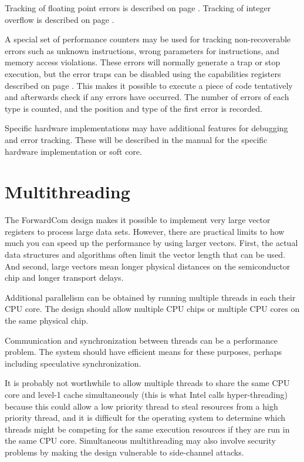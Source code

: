 \documentclass[forwardcom.tex]{subfiles}
\begin{document}
Tracking of floating point errors is described on page \pageref{ADifferentWayOfTrackingErrors}. Tracking of integer overflow is described on page \pageref{integerOverflowDetection}.
\vv

A special set of performance counters may be used for tracking non-recoverable errors such as unknown instructions, wrong parameters for instructions, and memory access violations. These errors will normally generate a trap or stop execution, but the error traps can be disabled using the capabilities registers described on page \pageref{table:capabilitiesRegisters}. This makes it possible to execute a piece of code tentatively and afterwards check if any errors have occurred. The number of errors of each type is counted, and the position and type of the first error is recorded.
\vv

Specific hardware implementations may have additional features for debugging and error tracking. These will be described in the manual for the specific hardware implementation or soft core.
\vv


\section{Multithreading}
The ForwardCom design makes it possible to implement very large vector registers to process large data sets. However, there are practical limits to how much you can speed up the performance by using larger vectors. First, the actual data structures and algorithms often limit the vector length that can be used. And second, large vectors mean longer physical distances on the semiconductor chip and longer transport delays.
\vv

Additional parallelism can be obtained by running multiple threads in each their CPU core. The design should allow multiple CPU chips or multiple CPU cores on the same physical chip.
\vv

Communication and synchronization between threads can be a performance problem. The system should have efficient means for these purposes, perhaps including speculative synchronization.
\vv

It is probably not worthwhile to allow multiple threads to share the same CPU core and level-1 cache simultaneously (this is what Intel calls hyper-threading) because this could allow a low priority thread to steal resources from a high priority thread, and it is difficult for the operating system to determine which threads might be competing for the same execution resources if they are run in the same CPU core. Simultaneous multithreading may also involve security problems by making the design vulnerable to side-channel attacks.
\vv
\end{document}

